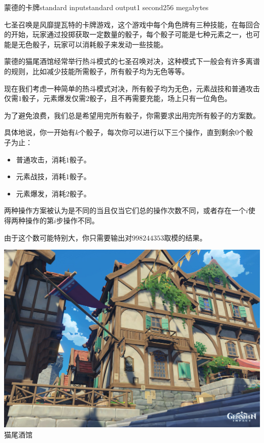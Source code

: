 \begin{problem}{蒙德的卡牌}{standard input}{standard output}{1 second}{256 megabytes}

七圣召唤是风靡提瓦特的卡牌游戏，这个游戏中每个角色牌有三种技能，在每回合的开始，玩家通过投掷获取一定数量的骰子，每个骰子可能是七种元素之一，也可能是无色骰子，玩家可以消耗骰子来发动一些技能。

蒙德的猫尾酒馆经常举行热斗模式的七圣召唤对决，这种模式下一般会有许多离谱的规则，比如减少技能所需骰子，所有骰子均为无色等等。

现在我们考虑一种简单的热斗模式对决，所有骰子均为无色，元素战技和普通攻击仅需$1$骰子，元素爆发仅需$2$骰子，且不再需要充能，场上只有一位角色。

为了避免浪费，我们总是希望用完所有骰子，你需要求出用完所有骰子的方案数。

具体地说，你一开始有$k$个骰子，每次你可以进行以下三个操作，直到剩余$0$个骰子为止：
\begin{itemize}
\item 普通攻击，消耗$1$骰子。
\item 元素战技，消耗$1$骰子。
\item 元素爆发，消耗$2$骰子。
\end{itemize}

两种操作方案被认为是不同的当且仅当它们总的操作次数不同，或者存在一个$i$使得两种操作的第$i$步操作不同。

由于这个数可能特别大，你只需要输出对$998244353$取模的结果。

\begin{center}
  \includegraphics[scale=0.15]{cattail.jpg} \\
  \small{猫尾酒馆}
\end{center}




\end{problem}
